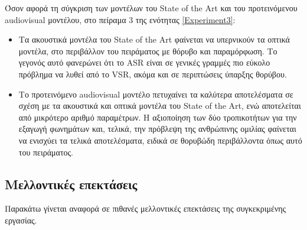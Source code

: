 Όσον αφορά τη σύγκριση των μοντέλων του State of the Art και του προτεινόμενου audiovisual μοντέλου, στο πείραμα 3 της ενότητας \ref{Experiment3}:

\begin{itemize}
\item Τα ακουστικά μοντέλα του State of the Art φαίνεται να υπερνικούν τα οπτικά μοντέλα, στο περιβάλλον του πειράματος με θόρυβο και παραμόρφωση. Το γεγονός αυτό φανερώνει ότι το ASR είναι σε γενικές γραμμές πιο εύκολο πρόβλημα να λυθεί από το VSR, ακόμα και σε περιπτώσεις ύπαρξης θορύβου.

\item Το προτεινόμενο audiovisual μοντέλο πετυχαίνει τα καλύτερα αποτελέσματα σε σχέση με τα ακουστικά και οπτικά μοντέλα του State of the Art, ενώ αποτελείται από μικρότερο αριθμό παραμέτρων. Η αξιοποίηση των δύο τροπικοτήτων για την εξαγωγή φωνημάτων και, τελικά, την πρόβλεψη της ανθρώπινης ομιλίας φαίνεται να ενισχύει τα τελικά αποτελέσματα, ειδικά σε θορυβώδη περιβάλλοντα όπως αυτό του πειράματος. 
\end{itemize}

\subsection{Μελλοντικές επεκτάσεις}
\label{Future}

Παρακάτω γίνεται αναφορά σε πιθανές μελλοντικές επεκτάσεις της συγκεκριμένης εργασίας.

